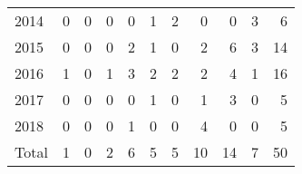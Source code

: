 \documentclass[a4paper]{article}
\begin{document}
\begin{table}
{\begin{tabular}[t]{lrrrrrrrrrr}
\hspace{1em}\hspace{1em}2014 & 0 & 0 & 0 & 0 & 1 & 2 & 0 & 0 & 3 & 6\\
\hspace{1em}\hspace{1em}2015 & 0 & 0 & 0 & 2 & 1 & 0 & 2 & 6 & 3 & 14\\
\hspace{1em}\hspace{1em}2016 & 1 & 0 & 1 & 3 & 2 & 2 & 2 & 4 & 1 & 16\\
\hspace{1em}\hspace{1em}2017 & 0 & 0 & 0 & 0 & 1 & 0 & 1 & 3 & 0 & 5\\
\hspace{1em}\hspace{1em}2018 & 0 & 0 & 0 & 1 & 0 & 0 & 4 & 0 & 0 & 5\\
\hspace{1em}\hspace{1em}Total & 1 & 0 & 2 & 6 & 5 & 5 & 10 & 14 & 7 & 50\\
\bottomrule
\end{tabular}}
\end{table}
\end{document}
